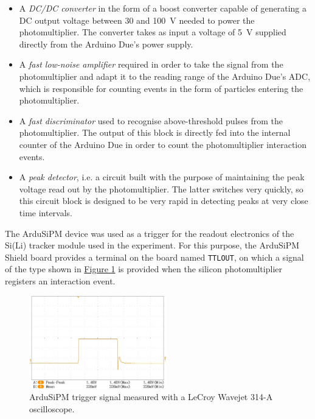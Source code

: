 \begin{itemize}
    \itemsep0em
    \item A \textit{DC/DC converter} in the form of a boost converter capable of generating a DC output voltage between 30 and \SI{100}{\volt} needed to power the photomultiplier. The converter takes as input a voltage of \SI{5}{\volt} supplied directly from the Arduino Due's power supply.
    \item A \textit{fast low-noise amplifier} required in order to take the signal from the photomultiplier and adapt it to the reading range of the Arduino Due's ADC, which is responsible for counting events in the form of particles entering the photomultiplier.
    \item A \textit{fast discriminator} used to recognise above-threshold pulses from the photomultiplier. The output of this block is directly fed into the internal counter of the Arduino Due in order to count the photomultiplier interaction events.
    \item A \textit{peak detector}, i.e. a circuit built with the purpose of maintaining the peak voltage read out by the photomultiplier. The latter switches very quickly, so this circuit block is designed to be very rapid in detecting peaks at very close time intervals.
\end{itemize}

\par
The ArduSiPM device was used as a trigger for the readout electronics of the Si(Li) tracker module used in the experiment. For this purpose, the ArduSiPM Shield board provides a terminal on the board named \texttt{TTLOUT}, on which a signal of the type shown in \hyperref[figArduiSiPMtrigger]{Figure \ref{figArduiSiPMtrigger}} is provided when the silicon photomultiplier registers an interaction event.

\begin{figure}[h!]
    \centering
    \includegraphics[width=0.53\textwidth]{Images/chap3/SCRN0097_crop.jpg}
    \caption{ArduSiPM trigger signal measured with a LeCroy Wavejet 314-A oscilloscope.}
    \label{figArduiSiPMtrigger}
\end{figure}

